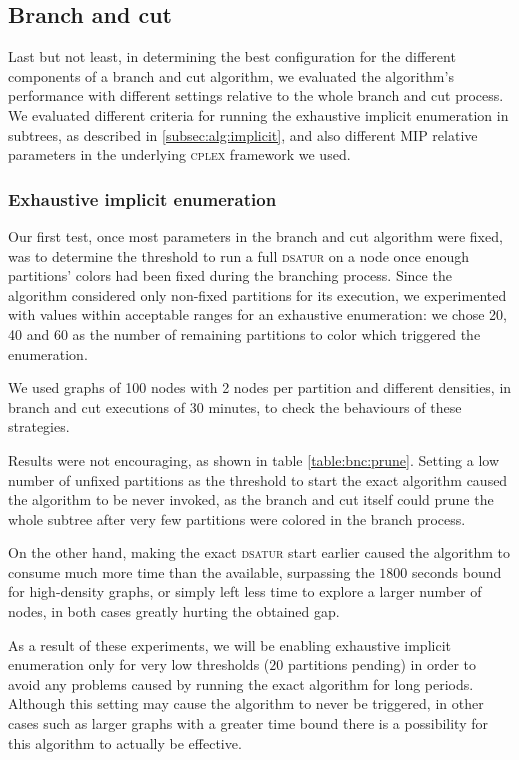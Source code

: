 
\subsection{Branch and cut}
\label{subsec:resultsbnc}

Last but not least, in determining the best configuration for the different components of a branch and cut algorithm, we evaluated the algorithm's performance with different settings relative to the whole branch and cut process. We evaluated different criteria for running the exhaustive implicit enumeration in subtrees, as described in \ref{subsec:alg:implicit}, and also different MIP relative parameters in the underlying \textsc{cplex} framework we used.

\subsubsection{Exhaustive implicit enumeration}

Our first test, once most parameters in the branch and cut algorithm were fixed, was to determine the threshold to run a full \textsc{dsatur} on a node once enough partitions' colors had been fixed during the branching process. Since the algorithm considered only non-fixed partitions for its execution, we experimented with values within acceptable ranges for an exhaustive enumeration: we chose 20, 40 and 60 as the number of remaining partitions to color which triggered the enumeration.

We used graphs of 100 nodes with 2 nodes per partition and different densities, in branch and cut executions of 30 minutes, to check the behaviours of these strategies.

Results were not encouraging, as shown in table \ref{table:bnc:prune}. Setting a low number of unfixed partitions as the threshold to start the exact algorithm caused the algorithm to be never invoked, as the branch and cut itself could prune the whole subtree after very few partitions were colored in the branch process.

On the other hand, making the exact \textsc{dsatur} start earlier caused the algorithm to consume much more time than the available, surpassing the $1800$ seconds bound for high-density graphs, or simply left less time to explore a larger number of nodes, in both cases greatly hurting the obtained gap.

As a result of these experiments, we will be enabling exhaustive implicit enumeration only for very low thresholds ($20$ partitions pending) in order to avoid any problems caused by running the exact algorithm for long periods. Although this setting may cause the algorithm to never be triggered, in other cases such as larger graphs with a greater time bound there is a possibility for this algorithm to actually be effective. 

